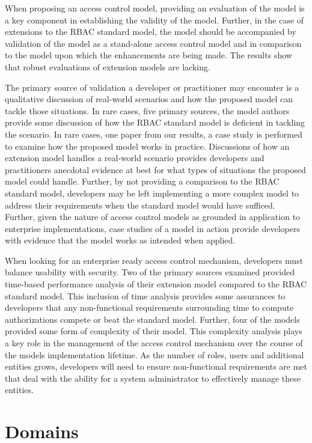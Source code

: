 When proposing an access control model, providing an evaluation of the model is a key component in establishing the validity of the model. 
Further, in the case of extensions to the RBAC standard model, the model should be accompanied by validation of the model as a stand-alone
access control model and in comparison to the model upon which the enhancements are being made. The results show that robust evaluations of
extension models are lacking. 

The primary source of validation a developer or practitioner may encounter is a qualitative discussion of real-world
scenarios and how the proposed model can tackle those situations. In rare cases, five primary sources, the model 
authors provide some discussion of how the RBAC standard model is deficient in tackling the scenario. In rare cases, 
one paper from our results, a case study is performed to examine how the proposed model works in practice. Discussions
of how an extension model handles a real-world scenario provides developers and practitioners anecdotal evidence at best
for what types of situations the proposed model could handle. Further, by not providing a comparison to the RBAC standard
model, developers may be left implementing a more complex model to address their requirements when the standard model would
have sufficed.  Further, given the nature of access control models as grounded in application to enterprise implementations, 
case studies of a model in action provide developers with evidence that the model works as intended when applied.

When looking for an enterprise ready access control mechanism, developers must balance usability with security. 
Two of the primary sources examined provided time-based performance analysis of their extension model compared
to the RBAC standard model. This inclusion of time analysis provides some assurances to developers that any non-functional
requirements surrounding time to compute authorizations compete or beat the standard model. Further, four of the models provided
some form of complexity of their model. This complexity analysis plays a key role in the management of the access control mechanism
over the course of the models implementation lifetime. As the number of roles, users and additional entities grows, developers will 
need to ensure non-functional requirements are met that deal with the ability for a system administrator to effectively manage these
entities.


\section{Domains} \label{sec:domains}

